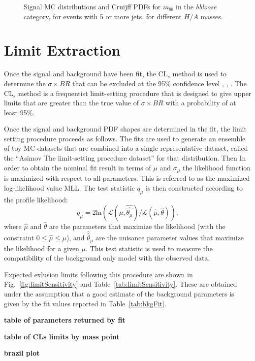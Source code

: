 \begin{figure}[phtb!]
\begin{center}
  \caption{Signal MC distributions and Cruijff PDFs for $m_{bb}$ in the {\it bbloose} category, for events with 5 or more jets, for different $H/A$ masses. \label{fig:signalPDFs_5j_bbloose}}
    \end{center}
\end{figure}



\section{Limit Extraction}
Once the signal and background have been fit, the CL$_s$ method is used to 
determine the $\sigma\times BR$ that can be excluded at the 95\% confidence
level \cite{CLS1}, \cite{CLS2}, \cite{CLS3}.  The CL$_s$ method is a
frequentist limit-setting procedure that is designed to give upper limits that
are greater than the true value of $\sigma\times BR$ with a probability of at
least 95\%.

Once the signal and background PDF shapes are determined in the fit,
the limit setting procedure proceeds as follows.  The fits are used to generate
an ensemble of toy MC datasets
that are combined into a single representative dataset, called the ``Asimov
The limit-setting procedure 
dataset'' for that distribution.  Then 
In order to obtain the nominal fit result in terms of $\mu$ and $\sigma_{\mu}$
the likelihood function is maximized with respect to all parameters.
This is referred to as the maximized log-likelihood value MLL.
The test statistic $q_\mu$ is then constructed according to
the profile likelihood:
\begin{equation}
q_\mu = 2 \mathrm{ln} (\mathcal{L} (\mu,
\hat{\hat{\theta_\mu}})/\mathcal{L} (\hat{\mu}, \hat{\theta})), 
\end{equation}
where
$\hat{\mu}$ and $\hat{\theta}$ are the parameters that maximize the
likelihood (with the constraint $0 \leq \hat{\mu} \leq \mu$), and
$\hat{\hat{\theta}}_\mu$ are the nuisance parameter values that maximize the
likelihood for a given $\mu$. This test statistic is used to measure
the compatibility of the background only model with the observed
data. 

Expected exlusion limits following this procedure are shown in Fig.~\ref{fig:limitSensitivity} and Table~\ref{tab:limitSensitivity}. These are obtained under the assumption that
 a good estimate of the background parameters is given by the fit values reported in Table~\ref{tab:bkgFit}.

\textbf{table of parameters returned by fit}

\textbf{table of CLs limits by mass point}

\textbf{brazil plot}

